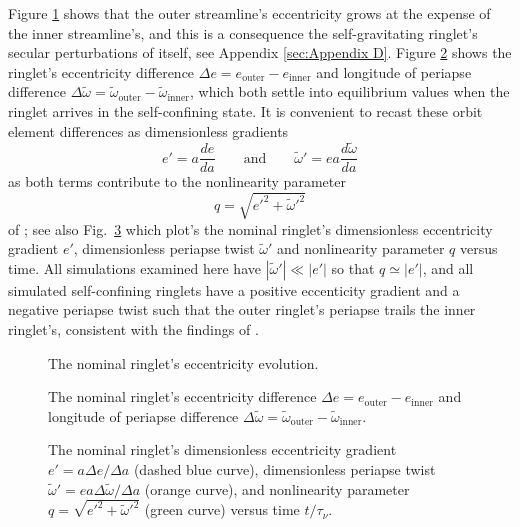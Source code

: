 \documentclass[preprint]{aastex62}
\begin{document}
Figure \ref{fig:e_nominal} shows that the outer streamline's eccentricity grows at the
expense of the inner streamline's, and this is a consequence the self-gravitating ringlet's
secular perturbations of itself, see Appendix \ref{sec:Appendix D}. 
Figure \ref{fig:de_nominal} shows
the ringlet's eccentricity difference $\Delta e = e_{\text{outer}} - e_{\text{inner}}$
and longitude of periapse difference
$\Delta\tilde{\omega} = \tilde{\omega}_{\text{outer}} - \tilde{\omega}_{\text{inner}}$,
which both settle into equilibrium values when the ringlet arrives in the self-confining
state. It is convenient to recast these orbit element differences as dimensionless gradients
\begin{equation}
    \label{eqn:e_prime}
    e' = a\frac{de}{da}
    \qquad\mbox{and}\qquad
    \tilde{\omega}' = ea\frac{d\tilde{\omega}}{da}
\end{equation}
as both terms contribute to the nonlinearity parameter
\begin{equation}
    \label{eqn:q}
    q = \sqrt{e'^2 + \tilde{\omega}'^2}
\end{equation}
of \cite{BGT83}; see also 
Fig.\ \ref{fig:de_prime_nominal} which plot's the nominal
ringlet's dimensionless eccentricity gradient $e'$, dimensionless periapse twist $\tilde{\omega}'$
and nonlinearity parameter $q$ versus time. All simulations examined here have
$|\tilde{\omega}'|\ll|e'|$ so that $q\simeq|e'|$, and all simulated self-confining ringlets
have a positive eccenticity gradient and a negative periapse twist such that
the outer ringlet's periapse trails the inner ringlet's, consistent with the findings of
\cite{BGT83}.

\begin{figure}
\caption{
\label{fig:e_nominal}
The nominal ringlet's eccentricity evolution.}
\end{figure}

\begin{figure}
    \caption{
        \label{fig:de_nominal}
        The nominal ringlet's eccentricity difference $\Delta e = e_{\text{outer}} - e_{\text{inner}}$
        and longitude of periapse difference
        $\Delta\tilde{\omega} = \tilde{\omega}_{\text{outer}} - \tilde{\omega}_{\text{inner}}$.
    }
\end{figure}

\begin{figure}
    \caption{
        \label{fig:de_prime_nominal}
        The nominal ringlet's dimensionless eccentricity gradient $e' = a\Delta e/\Delta a$
        (dashed blue curve), dimensionless periapse twist $\tilde{\omega}' = ea\Delta\tilde{\omega}/\Delta a$
        (orange curve), and nonlinearity parameter $q=\sqrt{e'^2 + \tilde{\omega}'^2}$
        (green curve) versus time $t/\tau_\nu$.
    }
\end{figure}
\end{document}
